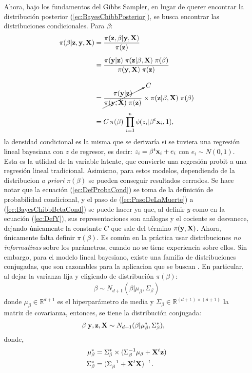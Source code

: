 \documentclass[../Main/Main.tex]{subfiles}
\begin{document}
Ahora, bajo los fundamentos del Gibbs Sampler, en lugar de querer encontrar la distribución posterior (\ref{ec:BayesChibbPosterior}), se busca encontrar las distribuciones condicionales. Para $\beta$:
\begin{align}
	\pi(\beta|\mathbf{z},\mathbf{y},\mathbf{X})
	& = \dfrac{\pi(\mathbf{z}, \beta| \mathbf{y}, \mathbf{X})}{\pi(\mathbf{z})} \label{ec:DefProbaCond}\\[5pt]
	& = \dfrac{\pi(\mathbf{y} | \mathbf{z})\;\pi(\mathbf{z}|\beta,\mathbf{X}) 
	\; \pi(\beta)}{\pi(\mathbf{y}, \mathbf{X}) \; \pi(\mathbf{z})} \nonumber \\[10pt]
	& = \cancelto{C}{\dfrac{\pi(\mathbf{y} | \mathbf{z})}{\pi(\mathbf{y}, \mathbf{X}) \; \pi(\mathbf{z})}} \times \pi(\mathbf{z}|\beta,\mathbf{X}) \; \pi(\beta) \label{ec:PasoDeLaMuerte} \\[5pt]
	& = C \,\pi(\beta) \, \prod_{i = 1}^n\phi(z_i|\beta^t\mathbf{x}_i,1), \label{ec:BayesChibbBetaCond}
\end{align}
la densidad condicional es la misma que se derivaría si se tuviera una regresión lineal bayesiana con $z$ de regresor, es decir: $z_i = \beta^t\mathbf{x}_i + e_i$ con $e_i \sim N(0,1)$. Esta es la utlidad de la variable latente, que convierte una regresión probit a una regresión lineal tradicional. Asimismo, para estos modelos, dependiendo de la distribucion \textit{a priori} $\pi(\beta)$ se pueden conseguir resultados cerrados. Se hace notar que la ecuación (\ref{ec:DefProbaCond}) se toma de la definición de probabilidad condicional, y el paso de (\ref{ec:PasoDeLaMuerte}) a (\ref{ec:BayesChibbBetaCond}) se puede hacer ya que, al definir $y$ como en la ecuación (\ref{ec:DefY}), sus representaciones son análogas y el cociente se desvanece, dejando únicamente la constante $C$ que sale del término $\pi(\mathbf{y}, \mathbf{X})$. Ahora, únicamente falta definir $\pi(\beta)$. Es común en la práctica usar distribuciones \textit{no informativas} sobre los parámetros, cuando no se tiene experiencia sobre ellos. Sin embargo, para el modelo lineal bayesiano, existe una familia de distribuciones conjugadas, que son razonables para la aplicacion que se buscan \autocite{banerjee2008gory}. En particular, al dejar la varianza fija y eligiendo de distribución $\pi(\beta)$:
\begin{align}
	\beta \sim N_{d+1}(\beta|\mu_{\beta}, \Sigma_{\beta}) \label{ec:BetaAPriori}
\end{align}
donde $\mu_{\beta}\in \mathbb{R}^{d+1}$ es el hiperparámetro de media  y $\Sigma_{\beta} \in \mathbb{R}^{(d+1) \times (d+1)}$ la matriz de covarianza,  entonces, se tiene la distribución conjugada:
\begin{align}
	\beta|\mathbf{y},\mathbf{z},\mathbf{X} &\sim N_{d+1}(\beta|\mu_\beta^*, \Sigma_\beta^*), \label{ec:SimBeta}
\end{align}	
donde,
\begin{align*}
	\mu_\beta^* &= \Sigma_\beta^* \times (\Sigma_\beta^{-1}\mu_\beta + 	\mathbf{X}^t\mathbf{z} )\nonumber \\
	 \Sigma_\beta^* &= (\Sigma_\beta^{-1} + \mathbf{X}^t\mathbf{X})^{-1}.\nonumber
\end{align*}	 
\end{document}
